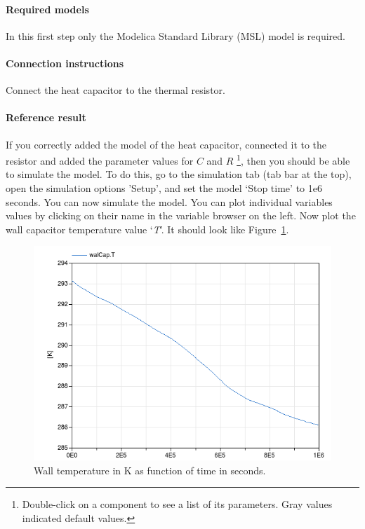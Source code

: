 \documentclass[10pt,a4paper]{article}
\begin{document}
\paragraph{Required models}
In this first step only the Modelica Standard Library (MSL) 
model 
is required.

\paragraph{Connection instructions}
Connect the heat capacitor to the thermal resistor.

\paragraph{Reference result}
If you correctly added the model of the heat capacitor, connected it to the resistor and 
added the parameter values for $C$ and $R$
\footnote{Double-click on a component to see a list of its parameters. Gray values indicated default values.},
then you should be able to simulate the model.
To do this, go to the simulation tab (tab bar at the top),
open the simulation options 'Setup',
and set the model `Stop time' to 1e6 seconds.
You can now simulate the model.
You can plot individual variables values by clicking on their name in the variable browser on the left.
Now plot the wall capacitor temperature value `\textit{T}'. 
It should look like Figure~\ref{fig:res1}.

\begin{figure}
\centering
\includegraphics[scale=0.6]{result1.png}
\caption{Wall temperature in K as function of time in seconds.}
\label{fig:res1}
\end{figure}
\end{document}
